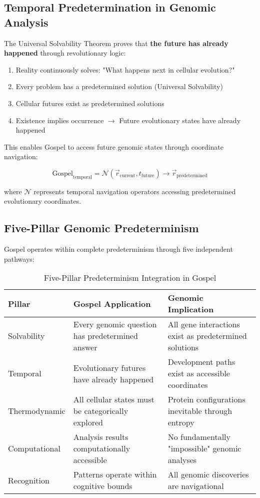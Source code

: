 \documentclass[12pt,a4paper]{article}
\begin{document}
\subsection{Temporal Predetermination in Genomic Analysis}

The Universal Solvability Theorem proves that \textbf{the future has already happened} through revolutionary logic:

\begin{enumerate}
\item Reality continuously solves: "What happens next in cellular evolution?"
\item Every problem has a predetermined solution (Universal Solvability)  
\item Cellular futures exist as predetermined solutions
\item Existence implies occurrence $\rightarrow$ Future evolutionary states have already happened
\end{enumerate}

This enables Gospel to access future genomic states through coordinate navigation:

\begin{equation}
\text{Gospel}_{\text{temporal}} = \mathcal{N}(\vec{r}_{\text{current}}, t_{\text{future}}) \rightarrow \vec{r}_{\text{predetermined}}
\end{equation}

where $\mathcal{N}$ represents temporal navigation operators accessing predetermined evolutionary coordinates.

\subsection{Five-Pillar Genomic Predeterminism}

Gospel operates within complete predeterminism through five independent pathways:

\begin{table}[H]
\centering
\caption{Five-Pillar Predeterminism Integration in Gospel}
\begin{tabular}{|l|p{3cm}|p{3.5cm}|}
\hline
\textbf{Pillar} & \textbf{Gospel Application} & \textbf{Genomic Implication} \\
\hline
Solvability & Every genomic question has predetermined answer & All gene interactions exist as predetermined solutions \\
\hline
Temporal & Evolutionary futures have already happened & Development paths exist as accessible coordinates \\
\hline
Thermodynamic & All cellular states must be categorically explored & Protein configurations inevitable through entropy \\
\hline
Computational & Analysis results computationally accessible & No fundamentally "impossible" genomic analyses \\
\hline
Recognition & Patterns operate within cognitive bounds & All genomic discoveries are navigational \\
\hline
\end{tabular}
\end{table}
\end{document}

